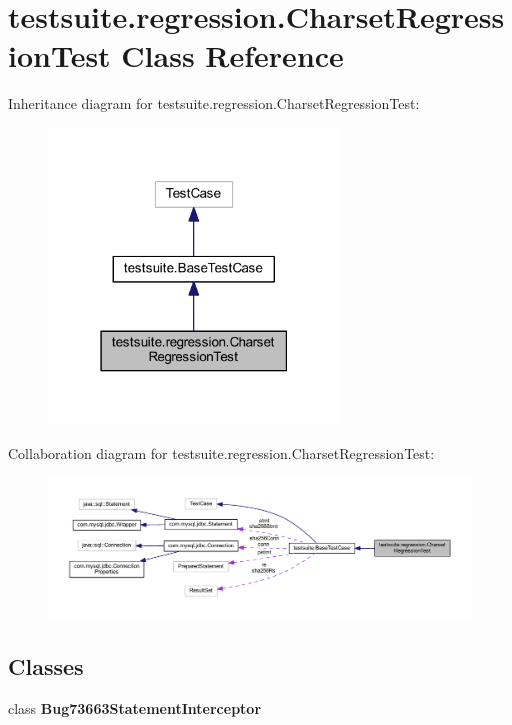 \hypertarget{classtestsuite_1_1regression_1_1_charset_regression_test}{}\section{testsuite.\+regression.\+Charset\+Regression\+Test Class Reference}
\label{classtestsuite_1_1regression_1_1_charset_regression_test}


Inheritance diagram for testsuite.\+regression.\+Charset\+Regression\+Test\+:
\nopagebreak
\begin{figure}[H]
\begin{center}
\leavevmode
\includegraphics[width=219pt]{classtestsuite_1_1regression_1_1_charset_regression_test__inherit__graph}
\end{center}
\end{figure}


Collaboration diagram for testsuite.\+regression.\+Charset\+Regression\+Test\+:
\nopagebreak
\begin{figure}[H]
\begin{center}
\leavevmode
\includegraphics[width=350pt]{classtestsuite_1_1regression_1_1_charset_regression_test__coll__graph}
\end{center}
\end{figure}
\subsection*{Classes}
\begin{DoxyCompactItemize}
\item 
class {\bfseries Bug73663\+Statement\+Interceptor}
\end{DoxyCompactItemize}
